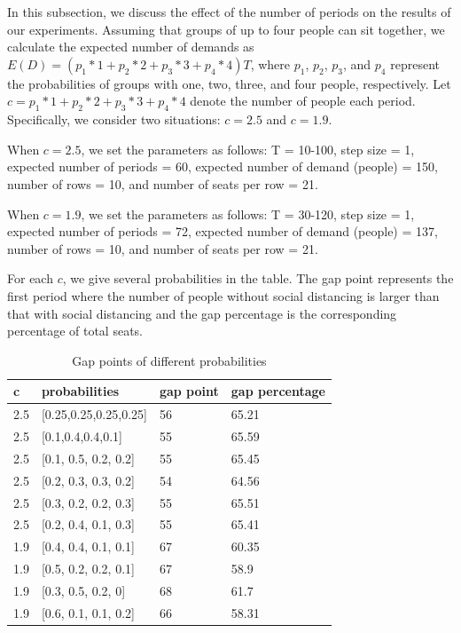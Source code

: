 In this subsection, we discuss the effect of the number of periods on the results of our experiments. 
Assuming that groups of up to four people can sit together, we calculate the expected number of demands as $E(D) = (p_1 * 1 + p_2 * 2 + p_3 * 3 + p_4 * 4) T$, where $p_1$, $p_2$, $p_3$, and $p_4$ represent the probabilities of groups with one, two, three, and four people, respectively. Let $c = p_1 * 1 + p_2 * 2 + p_3 * 3 + p_4 * 4$ denote the number of people each period. Specifically, we consider two situations: $c = 2.5$ and $c = 1.9$.

When $c = 2.5$, we set the parameters as follows: T = 10-100, step size = 1, expected number of periods = 60, expected number of demand (people) = 150, number of rows = 10, and number of seats per row = 21.

When $c = 1.9$, we set the parameters as follows: T = 30-120, step size = 1, expected number of periods = 72, expected number of demand (people) = 137, number of rows = 10, and number of seats per row = 21.

For each $c$, we give several probabilities in the table. The gap point represents the first period where the number of people without social distancing is larger than that with social distancing and the gap percentage is the corresponding percentage of total seats.




\begin{table}[ht]
  \centering
  \caption{Gap points of different probabilities}
  \begin{tabular}{|l|l|l|l|}
  \hline
  c  & probabilities & gap point & gap percentage \\
  \hline
  2.5  & [0.25,0.25,0.25,0.25] & 56 & 65.21 \\
  2.5  & [0.1,0.4,0.4,0.1] & 55 & 65.59 \\
  2.5  & [0.1, 0.5, 0.2, 0.2] & 55 & 65.45 \\
  2.5  & [0.2, 0.3, 0.3, 0.2] & 54 & 64.56 \\
  2.5  & [0.3, 0.2, 0.2, 0.3] & 55 & 65.51\\
  2.5  & [0.2, 0.4, 0.1, 0.3] & 55 & 65.41 \\
  1.9  & [0.4, 0.4, 0.1, 0.1] & 67 & 60.35 \\
  1.9  & [0.5, 0.2, 0.2, 0.1] & 67 & 58.9  \\
  1.9  & [0.3, 0.5, 0.2, 0]  &  68 & 61.7  \\
  1.9  & [0.6, 0.1, 0.1, 0.2] & 66 & 58.31 \\
  \hline
  \end{tabular}
\end{table}


